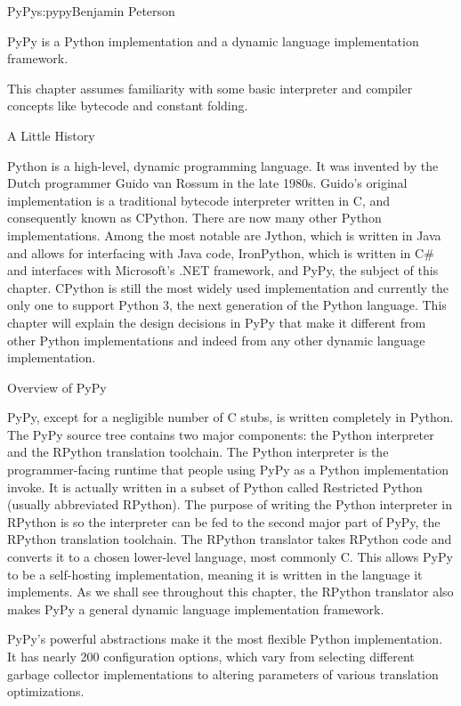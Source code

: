 \begin{aosachapter}{PyPy}{s:pypy}{Benjamin Peterson}

PyPy is a Python implementation and a dynamic language implementation framework.

This chapter assumes familiarity with some basic interpreter and compiler
concepts like bytecode and constant folding.

\begin{aosasect1}{A Little History}

Python is a high-level, dynamic programming language. It was invented by the Dutch
programmer Guido van Rossum in the late 1980s. Guido's original implementation
is a traditional bytecode interpreter written in C, and consequently 
known as CPython. There are now many other Python implementations. Among the
most notable are Jython, which is written in Java and allows for interfacing
with Java code, IronPython, which is written in C\# and interfaces with
Microsoft's .NET framework, and PyPy, the subject of this chapter. CPython is
still the most widely used implementation and currently the only one to support
Python 3, the next generation of the Python language. This chapter will explain
the design decisions in PyPy that make it different from other Python
implementations and indeed from any other dynamic language implementation.

\end{aosasect1}

\begin{aosasect1}{Overview of PyPy}

PyPy, except for a negligible number of C stubs, is written completely in
Python. The PyPy source tree contains two major components: the Python
interpreter and the RPython translation toolchain. The Python
interpreter is the programmer-facing runtime that people using PyPy as a
Python implementation invoke. It is actually written in a
subset of Python called Restricted Python (usually abbreviated RPython). The
purpose of writing the Python interpreter in RPython is so the interpreter can
be fed to the second major part of PyPy, the RPython translation toolchain. The
RPython translator takes RPython code and converts it to a chosen lower-level
language, most commonly C. This allows PyPy to be a self-hosting implementation,
meaning it is written in the language it implements. As we shall see throughout
this chapter, the RPython translator also makes PyPy a general dynamic language
implementation framework.

PyPy's powerful abstractions make it the most flexible Python implementation. It
has nearly 200 configuration options, which vary from selecting different
garbage collector implementations to altering parameters of various translation
optimizations.


\end{aosasect1}
\end{aosachapter}
